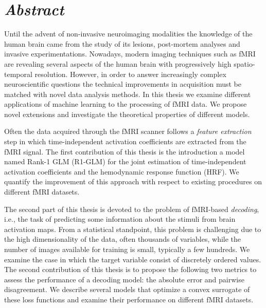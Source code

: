 \documentclass[nobib, a4paper, notoc, twoside, justified]{tufte-book}
\begin{document}
\newpage\null\thispagestyle{empty}\newpage
\vspace*{\fill}

{\section*{\Huge \it Abstract}}


Until the advent of non-invasive neuroimaging modalities the knowledge of the human brain came from the study of its lesions, post-mortem analyses and invasive experimentations. Nowadays, modern imaging techniques such as fMRI are revealing several aspects of the human brain with progressively high spatio-temporal resolution. However, in order to answer increasingly complex neuroscientific questions the technical improvements in acquisition must be matched with novel data analysis methods. In this thesis we examine different applications of machine learning to the processing of fMRI data. We propose novel extensions and investigate the theoretical properties of different models.


Often the data acquired through the fMRI scanner follows a \emph{feature extraction} step in which time-independent activation coefficients are extracted from the fMRI signal. The first contribution of this thesis is the introduction a model named Rank-1 GLM (R1-GLM) for the joint estimation of time-independent activation coefficients and the hemodynamic response function (HRF). We quantify the improvement of this approach with respect to existing procedures on different fMRI datasets.

The second part of this thesis is devoted to the problem of fMRI-based \emph{decoding}, i.e., the task of predicting some information about the stimuli from brain activation maps. From a statistical standpoint, this problem is challenging
due to the high dimensionality of the data, often thousands of
variables, while the number of images available for training is small,
typically a few hundreds. We examine the case in which the target variable consist of discretely ordered values. The second contribution of this thesis is to propose the following two metrics to assess the performance of a decoding model: the absolute error and pairwise disagreement. We describe several models that optimize a convex surrogate of these loss functions and examine their performance on different fMRI datasets.
\end{document}
